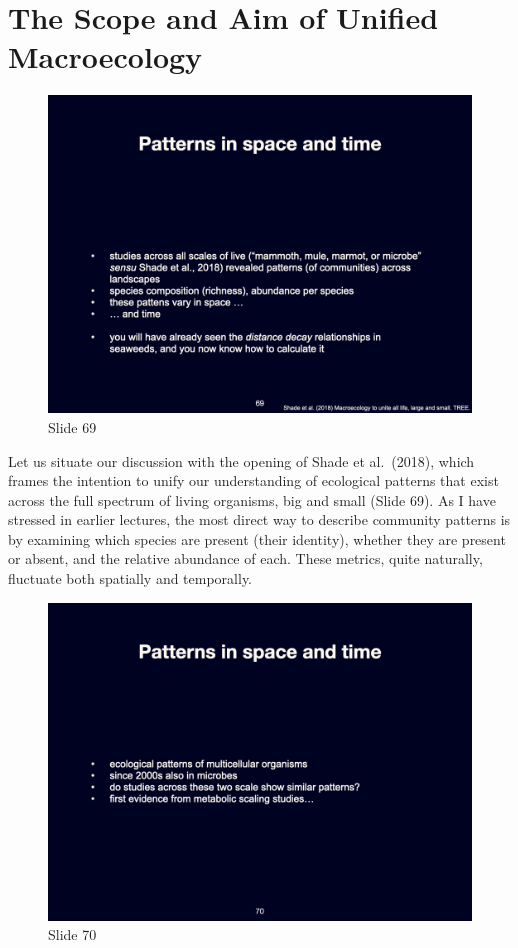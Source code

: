 \documentclass[
  10pt,
]{book}
\begin{document}
\section{The Scope and Aim of Unified
Macroecology}\label{the-scope-and-aim-of-unified-macroecology}

\begin{figure}[ht]
\centering
\includegraphics[width=0.8\linewidth]{../images/BDC334/BDC334-069.jpeg}
\caption*{Slide 69}
\end{figure}

Let us situate our discussion with the opening of Shade et al.~(2018),
which frames the intention to unify our understanding of ecological
patterns that exist across the full spectrum of living organisms, big
and small (Slide 69). As I have stressed in earlier lectures, the most
direct way to describe community patterns is by examining which species
are present (their identity), whether they are present or absent, and
the relative abundance of each. These metrics, quite naturally,
fluctuate both spatially and temporally.

\begin{figure}[ht]
\centering
\includegraphics[width=0.8\linewidth]{../images/BDC334/BDC334-070.jpeg}
\caption*{Slide 70}
\end{figure}
\end{document}
